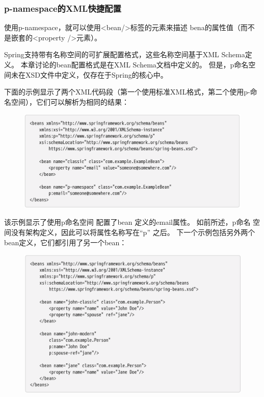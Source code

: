 \subsubsection{p-namespace的XML快捷配置}
使用p-namespace，就可以使用<bean/>标签的元素来描述
bena的属性值（而不是嵌套的<property />元素）。

Spring支持带有名称空间的可扩展配置格式，这些名称空间基于XML Schema定义。 本章讨论的bean配置格式是在XML Schema文档中定义的。 但是，p命名空间未在XSD文件中定义，仅存在于Spring的核心中。

下面的示例显示了两个XML代码段（第一个使用标准XML格式，第二个使用p-命名空间），它们可以解析为相同的结果：

\begin{figure}[ht]
    \centering
    \includegraphics[width=1\linewidth]{./Figure/IMG_code_50.png}
\end{figure}

该示例显示了使用p命名空间
配置了bean 定义的email属性。
如前所述，p命名
空间没有架构定义，因此可以将属性名称写在“p” 之后。
\newpage
下一个示例包括另外两个bean定义，它们都引用了另一个bean：

\begin{figure}[ht]
    \centering
    \includegraphics[width=1\linewidth]{./Figure/IMG_code_51.png}
\end{figure}

